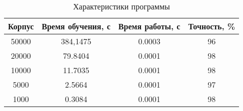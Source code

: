 \begin{table}[h!]
\caption{Характеристики программы}
\label{props}
\centering
    \begin{tabular}{|c|c|c|c|}
		\hline Корпус & Время обучения, с & Время работы, с & Точность, \% \\
		\hline 50000 & 384,1475 & 0.0003 & 96 \\
		\hline 20000 & 79.8404 & 0.0001 & 98 \\
		\hline 10000 & 11.7035 & 0.0001 & 98 \\
		\hline 5000 & 2.5664 & 0.0001 & 97 \\
		\hline 1000 & 0.3084 & 0.0001 & 98 \\
		\hline
	\end{tabular}
\end{table}
\

\newpage

